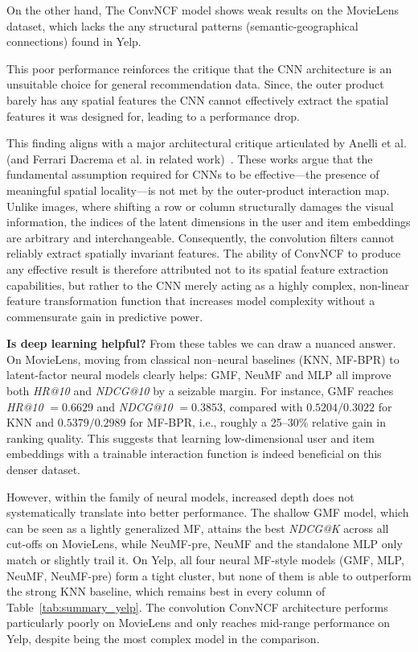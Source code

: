 \documentclass[11pt]{article}
\begin{document}
On the other hand, The ConvNCF model shows weak results on the MovieLens dataset, which lacks the any structural patterns (semantic-geographical connections) found in Yelp.

This poor performance reinforces the critique that the CNN architecture is an unsuitable choice for general recommendation data. Since, the outer product barely has any spatial features the CNN cannot effectively extract the spatial features it was designed for, leading to a performance drop.

This finding aligns with a major architectural critique articulated by Anelli et al. (and Ferrari Dacrema et al. in related work)~\cite{anelli2020reenvisioning}. These works argue that the fundamental assumption required for CNNs to be effective—the presence of meaningful spatial locality—is not met by the outer-product interaction map. Unlike images, where shifting a row or column structurally damages the visual information, the indices of the latent dimensions in the user and item embeddings are arbitrary and interchangeable. Consequently, the convolution filters cannot reliably extract spatially invariant features. The ability of ConvNCF to produce any effective result is therefore attributed not to its spatial feature extraction capabilities, but rather to the CNN merely acting as a highly complex, non-linear feature transformation function that increases model complexity without a commensurate gain in predictive power.

\textbf{Is deep learning helpful?}
From these tables we can draw a nuanced answer. On MovieLens, moving from classical non–neural baselines (KNN, MF-BPR) to latent-factor neural models clearly helps: GMF, NeuMF and MLP all improve both \emph{HR@10} and \emph{NDCG@10} by a seizable margin. For instance, GMF reaches \emph{HR@10} $=0.6629$ and \emph{NDCG@10} $=0.3853$, compared with $0.5204/0.3022$ for KNN and $0.5379/0.2989$ for MF-BPR, i.e., roughly a 25–30\% relative gain in ranking quality. This suggests that learning low-dimensional user and item embeddings with a trainable interaction function is indeed beneficial on this denser dataset.

However, within the family of neural models, increased depth does not systematically translate into better performance. The shallow GMF model, which can be seen as a lightly generalized MF, attains the best \emph{NDCG@K} across all cut-offs on MovieLens, while NeuMF-pre, NeuMF and the standalone MLP only match or slightly trail it. On Yelp, all four neural MF-style models (GMF, MLP, NeuMF, NeuMF-pre) form a tight cluster, but none of them is able to outperform the strong KNN baseline, which remains best in every column of Table~\ref{tab:summary_yelp}. The convolution ConvNCF architecture performs particularly poorly on MovieLens and only reaches mid-range performance on Yelp, despite being the most complex model in the comparison.
\end{document}
